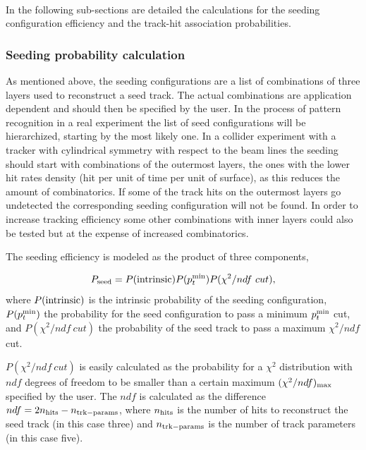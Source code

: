 ~\\
\noindent
In the following sub-sections are detailed the calculations for the seeding configuration efficiency and the track-hit association probabilities.

\subsubsection*{Seeding probability calculation}

As mentioned above, the seeding configurations are a list of combinations of three layers used to reconstruct a seed track. The actual combinations are application 
dependent and should then be specified by the user. In the process of pattern recognition in a real experiment the list of seed configurations will be hierarchized, 
starting by the most likely one. In a collider experiment with a tracker with cylindrical symmetry with respect to the beam lines the seeding should start with 
combinations of the outermost layers, the ones with the lower hit rates density (hit per unit of time per unit of surface), as this reduces the amount of combinatorics.
If some of the track hits on the outermost layers go undetected the corresponding seeding configuration will not be found. In order to increase tracking efficiency 
some other combinations with inner layers could also be tested but at the expense of increased combinatorics.

The seeding efficiency is modeled as the product of three components,

\begin{equation}
 P_{\rm seed} = P({\rm intrinsic}) P(p^{\rm min}_t) P(\chi^2/ndf~cut),
\end{equation}
\noindent
where $P({\rm intrinsic})$ is the intrinsic probability of the seeding configuration, $P(p^{\rm min}_t)$ the probability for the seed configuration to pass a 
minimum $p^{\rm min}_t$ cut, and $P(\chi^2/ndf~cut)$ the probability of the seed track to pass a maximum $\chi^2/ndf$ cut.

$P(\chi^2/ndf~cut)$ is easily calculated as the probability for a $\chi^2$ distribution with $ndf$ degrees of freedom to be smaller than a certain maximum $(\chi^2/ndf)_{\rm max}$ 
specified by the user. The $ndf$ is calculated as the difference $ndf = 2n_{\rm hits} - n_{\rm trk-params}$, where $n_{\rm hits}$ is the number of hits to reconstruct 
the seed track (in this case three) and $n_{\rm trk-params}$ is the number of track parameters (in this case five).

